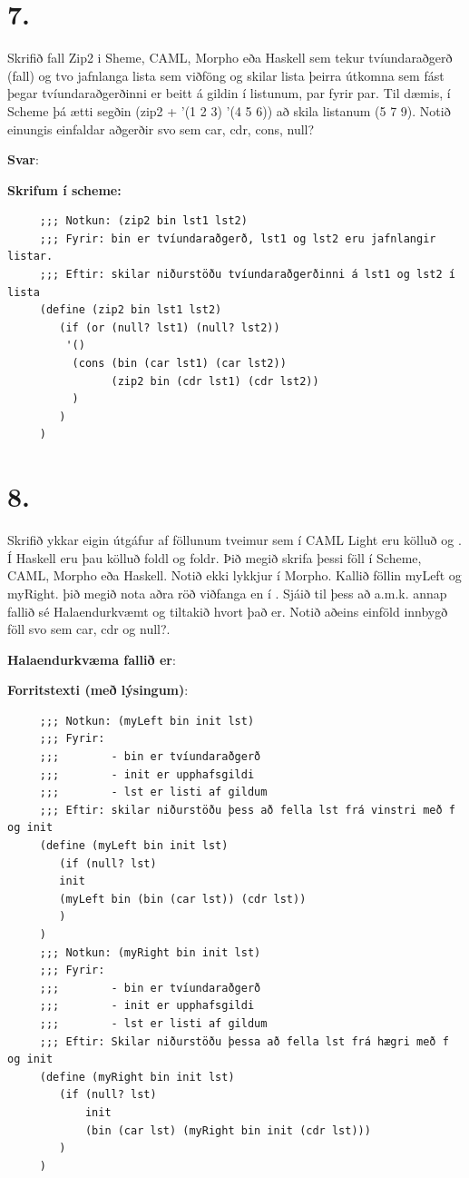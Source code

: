\documentclass{article}
\newcommand{\bo}[1]{\textbf{#1}}
\begin{document}
     \newpage 

     \section{7.}

     Skrifið fall Zip2 i Sheme, CAML, Morpho eða Haskell sem tekur 
     tvíundaraðgerð (fall) og tvo jafnlanga lista sem viðföng og skilar lista þeirra útkomna sem fást þegar tvíundaraðgerðinni er beitt á
     gildin í listunum, par fyrir par. Til dæmis, í Scheme þá ætti segðin
     (zip2 + '(1 2 3) '(4 5 6)) að skila listanum (5 7 9). Notið einungis
     einfaldar aðgerðir svo sem car, cdr, cons, null?

     \textbf{Svar}:

     \bo{Skrifum í scheme:}

     \begin{lstlisting}
     ;;; Notkun: (zip2 bin lst1 lst2)
     ;;; Fyrir: bin er tvíundaraðgerð, lst1 og lst2 eru jafnlangir listar.
     ;;; Eftir: skilar niðurstöðu tvíundaraðgerðinni á lst1 og lst2 í lista
     (define (zip2 bin lst1 lst2)
        (if (or (null? lst1) (null? lst2))
         '()
          (cons (bin (car lst1) (car lst2))
                (zip2 bin (cdr lst1) (cdr lst2))
          )
        )
     )
     \end{lstlisting}


     \newpage
     \section{8.}
     Skrifið ykkar eigin útgáfur af föllunum tveimur sem í CAML Light 
     eru kölluð  og . Í Haskell eru þau kölluð foldl og foldr. 
     Þið megið skrifa þessi föll í Scheme, CAML, Morpho eða Haskell. Notið
     ekki lykkjur í Morpho. Kallið föllin myLeft og myRight. þið megið nota aðra röð viðfanga en í . Sjáið til þess að a.m.k.
     annap fallið sé Halaendurkvæmt og tiltakið hvort það er. Notið 
     aðeins einföld innbygð föll svo sem car, cdr og null?.


     \textbf{Halaendurkvæma fallið er}:


     \textbf{Forritstexti (með lýsingum)}:

     \begin{lstlisting}
     ;;; Notkun: (myLeft bin init lst)
     ;;; Fyrir: 
     ;;;        - bin er tvíundaraðgerð
     ;;;        - init er upphafsgildi
     ;;;        - lst er listi af gildum
     ;;; Eftir: skilar niðurstöðu þess að fella lst frá vinstri með f og init
     (define (myLeft bin init lst)
        (if (null? lst)
        init
        (myLeft bin (bin (car lst)) (cdr lst))
        )
     )
     ;;; Notkun: (myRight bin init lst)
     ;;; Fyrir: 
     ;;;        - bin er tvíundaraðgerð
     ;;;        - init er upphafsgildi
     ;;;        - lst er listi af gildum
     ;;; Eftir: Skilar niðurstöðu þessa að fella lst frá hægri með f og init
     (define (myRight bin init lst)
        (if (null? lst)
            init
            (bin (car lst) (myRight bin init (cdr lst)))
        )   
     )
     \end{lstlisting}
\end{document}
